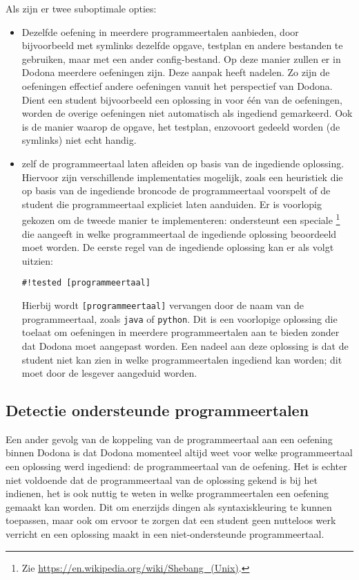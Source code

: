 Als  zijn er twee suboptimale opties:
\begin{itemize}
    \item Dezelfde oefening in meerdere programmeertalen aanbieden, door bijvoorbeeld met symlinks dezelfde opgave, testplan en andere bestanden te gebruiken, maar met een ander config-bestand.
    Op deze manier zullen er in Dodona meerdere oefeningen zijn.
    Deze aanpak heeft nadelen.
    Zo zijn de oefeningen effectief andere oefeningen vanuit het perspectief van Dodona.
    Dient een student bijvoorbeeld een oplossing in voor één van de oefeningen, worden de overige oefeningen niet automatisch als ingediend gemarkeerd.
    Ook is de manier waarop de opgave, het testplan, enzovoort gedeeld worden (de symlinks) niet echt handig.
    \item \tested{} zelf de programmeertaal laten afleiden op basis van de ingediende oplossing.
    Hiervoor zijn verschillende implementaties mogelijk, zoals een heuristiek die op basis van de ingediende broncode de programmeertaal voorspelt of de student die programmeertaal expliciet laten aanduiden.
    Er is voorlopig gekozen om de tweede manier te implementeren: \tested{} ondersteunt een speciale \footnote{Zie \url{https://en.wikipedia.org/wiki/Shebang_(Unix)}.} die aangeeft in welke programmeertaal de ingediende oplossing beoordeeld moet worden.
    De eerste regel van de ingediende oplossing kan er als volgt uitzien:
    \begin{verbatim}
#!tested [programmeertaal]
    \end{verbatim}
    Hierbij wordt \texttt{[programmeertaal]} vervangen door de naam van de programmeertaal, zoals \texttt{java} of \texttt{python}.
    Dit is een voorlopige oplossing die toelaat om oefeningen in meerdere programmeertalen aan te bieden zonder dat Dodona moet aangepast worden.
    Een nadeel aan deze oplossing is dat de student niet kan zien in welke programmeertalen ingediend kan worden;
    dit moet door de lesgever aangeduid worden.
\end{itemize}

\subsection{Detectie ondersteunde programmeertalen}\label{subsec:detectie-beschikbare-programmeertalen}

Een ander gevolg van de koppeling van de programmeertaal aan een oefening binnen Dodona is dat Dodona momenteel altijd weet voor welke programmeertaal een oplossing werd ingediend: de programmeertaal van de oefening.
Het is echter niet voldoende dat de programmeertaal van de oplossing gekend is bij het indienen,
het is ook nuttig te weten in welke programmeertalen een oefening gemaakt kan worden.
Dit om enerzijds dingen als syntaxiskleuring te kunnen toepassen, maar ook om ervoor te zorgen dat een student geen nutteloos werk verricht en een oplossing maakt in een niet-ondersteunde programmeertaal.

